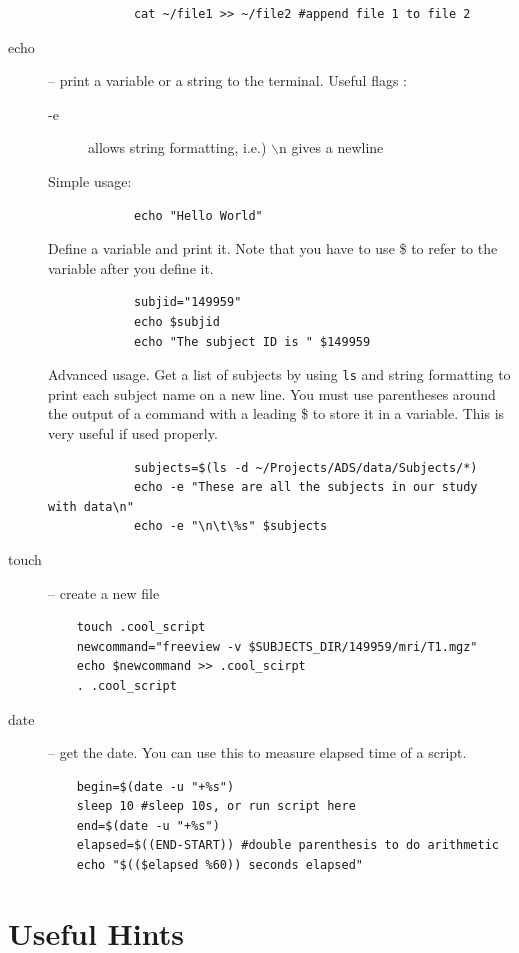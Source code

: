 \documentclass[paper=a4, fontsize=11pt]{scrartcl} %
\numberwithin{equation}{section} %
\numberwithin{figure}{section} %
\numberwithin{table}{section} %
\begin{document}
\begin{appendices}
\begin{description}
\begin{lstlisting}
			cat ~/file1 >> ~/file2 #append file 1 to file 2
			\end{lstlisting}							
\item[echo] -- print a variable or a string to the terminal. Useful flags :
			\begin{description}
			\item[-e] allows string formatting, i.e.) $\backslash$n gives a newline
			\end{description}
			Simple usage:
			\begin{lstlisting}
			echo "Hello World"
			\end{lstlisting}
			Define a variable and print it.  Note that you have to use \$ to refer to the variable after you define it.		
			\begin{lstlisting}
			subjid="149959"
			echo $subjid
			echo "The subject ID is " $149959
			\end{lstlisting}						
			Advanced usage.  Get a list of subjects by using \texttt{ls} and string formatting to print each subject name on a new line.  You must use parentheses around the output of a command with a leading \$ to store it in a variable.  This is very useful if used properly.
			\begin{lstlisting}
			subjects=$(ls -d ~/Projects/ADS/data/Subjects/*)
			echo -e "These are all the subjects in our study with data\n" 
			echo -e "\n\t\%s" $subjects
			\end{lstlisting}											
\item[touch] -- create a new file
	\begin{lstlisting}
	touch .cool_script
	newcommand="freeview -v $SUBJECTS_DIR/149959/mri/T1.mgz"
	echo $newcommand >> .cool_scirpt
	. .cool_script
	\end{lstlisting}
\item[date] -- get the date.
	You can use this to measure elapsed time of a script.
	\begin{lstlisting}
	begin=$(date -u "+%s")
	sleep 10 #sleep 10s, or run script here
	end=$(date -u "+%s")
	elapsed=$((END-START)) #double parenthesis to do arithmetic
	echo "$(($elapsed %60)) seconds elapsed"
	\end{lstlisting}
\end{description}

\section{Useful Hints}

\begin{description}


\end{description}
\end{appendices}
\end{document}
